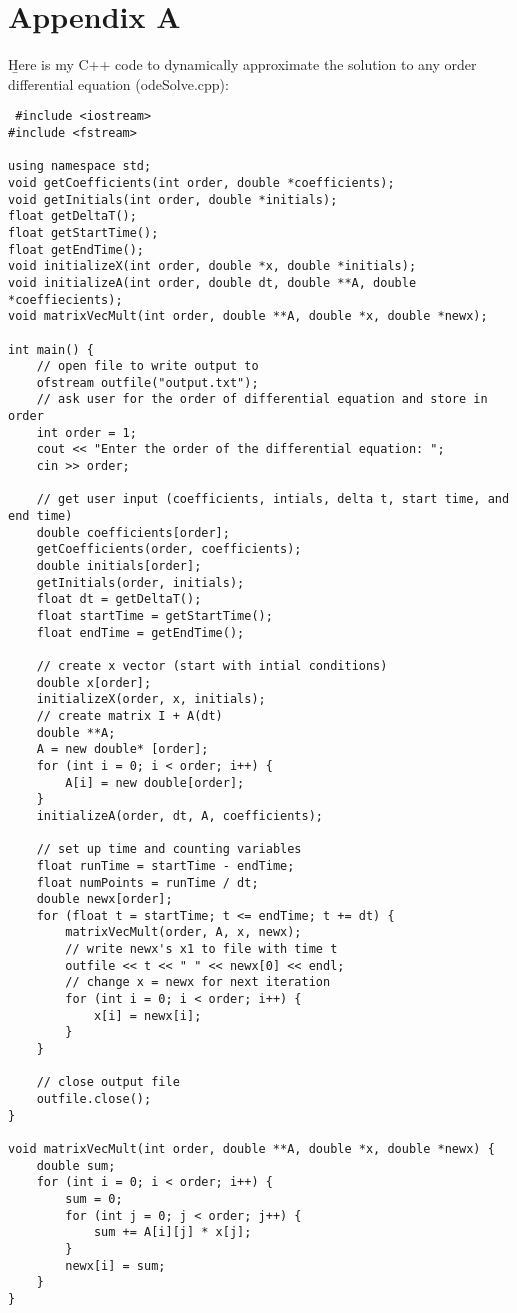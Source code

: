 \documentclass[10pt, AMS Euler]{article}
\begin{document}
\section*{Appendix A}
\b Here is my C++ code to dynamically approximate the solution to any order differential equation (odeSolve.cpp):
\begin{lstlisting}
 #include <iostream>
#include <fstream>

using namespace std;
void getCoefficients(int order, double *coefficients);
void getInitials(int order, double *initials);
float getDeltaT();
float getStartTime();
float getEndTime();
void initializeX(int order, double *x, double *initials);
void initializeA(int order, double dt, double **A, double *coeffiecients);
void matrixVecMult(int order, double **A, double *x, double *newx);

int main() {
    // open file to write output to
    ofstream outfile("output.txt");
    // ask user for the order of differential equation and store in order
    int order = 1;
    cout << "Enter the order of the differential equation: ";
    cin >> order;
    
    // get user input (coefficients, intials, delta t, start time, and end time)
    double coefficients[order];
    getCoefficients(order, coefficients);
    double initials[order];
    getInitials(order, initials);
    float dt = getDeltaT();
    float startTime = getStartTime();
    float endTime = getEndTime();

    // create x vector (start with intial conditions)
    double x[order];
    initializeX(order, x, initials);
    // create matrix I + A(dt)
    double **A;
    A = new double* [order];
    for (int i = 0; i < order; i++) {
        A[i] = new double[order];
    }
    initializeA(order, dt, A, coefficients);

    // set up time and counting variables
    float runTime = startTime - endTime;
    float numPoints = runTime / dt;
    double newx[order];
    for (float t = startTime; t <= endTime; t += dt) {
        matrixVecMult(order, A, x, newx);
        // write newx's x1 to file with time t
        outfile << t << " " << newx[0] << endl;
        // change x = newx for next iteration
        for (int i = 0; i < order; i++) {
            x[i] = newx[i];
        }
    }  

    // close output file 
    outfile.close();
}

void matrixVecMult(int order, double **A, double *x, double *newx) {
    double sum;
    for (int i = 0; i < order; i++) {
        sum = 0;
        for (int j = 0; j < order; j++) {
            sum += A[i][j] * x[j];
        }
        newx[i] = sum;
    }
}


\end{lstlisting}
\end{document}
